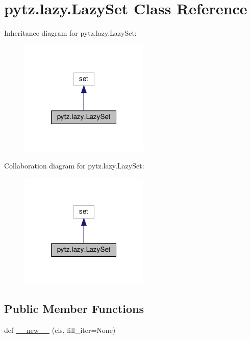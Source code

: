 \hypertarget{classpytz_1_1lazy_1_1LazySet}{}\section{pytz.\+lazy.\+Lazy\+Set Class Reference}
\label{classpytz_1_1lazy_1_1LazySet}


Inheritance diagram for pytz.\+lazy.\+Lazy\+Set\+:
\nopagebreak
\begin{figure}[H]
\begin{center}
\leavevmode
\includegraphics[width=175pt]{classpytz_1_1lazy_1_1LazySet__inherit__graph}
\end{center}
\end{figure}


Collaboration diagram for pytz.\+lazy.\+Lazy\+Set\+:
\nopagebreak
\begin{figure}[H]
\begin{center}
\leavevmode
\includegraphics[width=175pt]{classpytz_1_1lazy_1_1LazySet__coll__graph}
\end{center}
\end{figure}
\subsection*{Public Member Functions}
\begin{DoxyCompactItemize}
\item 
def \hyperlink{classpytz_1_1lazy_1_1LazySet_a24d630319475ff914aeb7d6e8b2b1454}{\+\_\+\+\_\+new\+\_\+\+\_\+} (cls, fill\+\_\+iter=None)
\end{DoxyCompactItemize}


